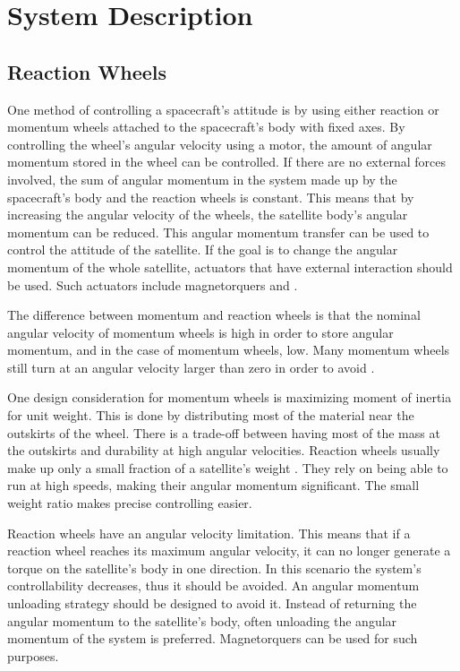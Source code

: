 \chapter{System Description}\label{chap:systemDescribtion}

\section{Reaction Wheels}

One method of controlling a spacecraft's attitude is by using either reaction or momentum wheels attached to the spacecraft's body with fixed axes. By controlling the wheel's angular velocity using a motor, the amount of angular momentum stored in the wheel can be controlled. If there are no external forces involved, the sum of angular momentum in the system made up by the spacecraft's body and the reaction wheels is constant. This means that by increasing the angular velocity of the wheels, the satellite body's angular momentum can be reduced. This angular momentum transfer can be used to control the attitude of the satellite. If the goal is to change the angular momentum of the whole satellite, actuators that have external interaction should be used. Such actuators include magnetorquers and  .

The difference between momentum and reaction wheels is that the nominal angular velocity of momentum wheels is high in order to store angular momentum, and in the case of momentum wheels, low. Many momentum wheels still turn at an angular velocity larger than zero in order to avoid .

One design consideration for momentum wheels is maximizing moment of inertia for unit weight. This is done by distributing most of the material near the outskirts of the wheel. There is a trade-off between having most of the mass at the outskirts and durability at high angular velocities. 
Reaction wheels usually make up only a small fraction of a satellite's weight . They rely on being able to run at high speeds, making their angular momentum significant. The small weight ratio makes precise controlling easier.

Reaction wheels have an angular velocity limitation. This means that if a reaction wheel reaches its maximum angular velocity, it can no longer generate a torque on the satellite's body in one direction. In this scenario the system's controllability decreases, thus it should be avoided. An angular momentum unloading strategy should be designed to avoid it. Instead of returning the angular momentum to the satellite's body, often unloading the angular momentum of the system is preferred. Magnetorquers can be used for such purposes.

